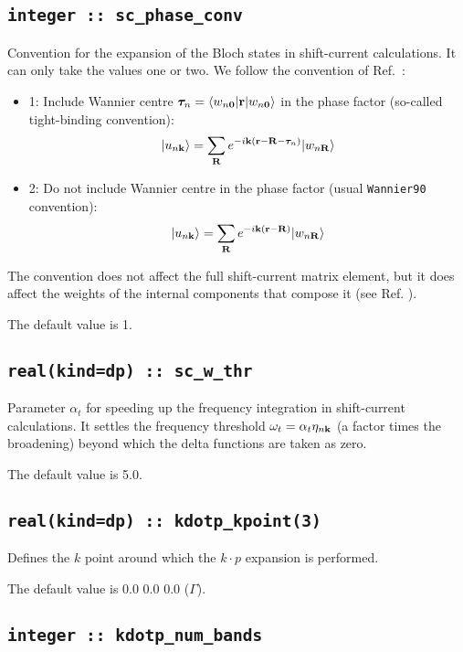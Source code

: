 \subsection{\tt integer :: sc\_phase\_conv}

Convention for the expansion of the Bloch states in shift-current calculations. It can only take the values one or two.
We follow the convention of Ref.~\cite{pythtb}:
\begin{itemize}

\item
  1: Include Wannier centre ${\bm \tau}_{n}=\langle w_{n{\bf 0}}|{\bf r}| w_{n{\bf 0}} \rangle$ in the phase factor
  (so-called tight-binding convention):
%
$$
|u_{n\bf{k}}\rangle = \sum_{\bf{R}} e^{-i{\bf k}({\bf r}-{\bf R}-{\bm \tau}_{n})}| w_{n\bf{R}} \rangle
$$ 
%

\item
  2: Do not include Wannier centre in the phase factor (usual \verb|Wannier90| convention):
%
$$
|u_{n\bf{k}}\rangle = \sum_{\bf{R}} e^{-i\bf{k}(\bf{r}-\bf{R})}| w_{n\bf{R}} \rangle
$$ 
%
\end{itemize}
The convention does not affect the full shift-current matrix element, but it does affect
the weights of the internal components that compose it (see Ref. \cite{ibanez-azpiroz_ab_2018}). 

The default value is 1. 


\subsection{\tt real(kind=dp)  :: sc\_w\_thr}

Parameter $\alpha_{t}$ for speeding up the frequency integration in shift-current calculations.
It settles the frequency threshold $\omega_{t}=\alpha_{t}\eta_{n{\bf k}}$
(a factor times the broadening)
beyond which the delta functions are taken as zero. 


The default value is 5.0. 



\subsection{\tt real(kind=dp)  :: kdotp\_kpoint(3)}

Defines the $k$ point around which the $k\cdot p$  
expansion is performed. 


The default value is 0.0 0.0 0.0 ($\Gamma$). 


\subsection{\tt integer  :: kdotp\_num\_bands}

